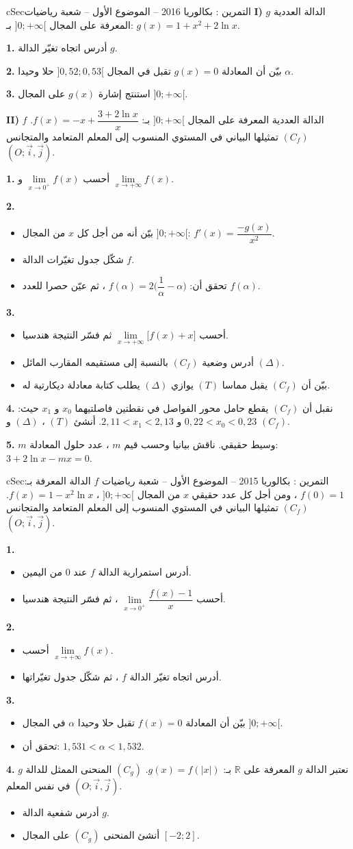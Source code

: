 \documentclass[12pt,a4paper]{article}
\newenvironment{BOX}[2]{\begin{otherlanguage}{english}\begin{arbox}{#1}{#2}}{\end{arbox}\end{otherlanguage}}
\newcounter{exo}
\newenvironment{tamrin}[1]{\stepcounter{exo}\begin{BOX}{cSec}{التمرين \theexo: #1}}{\end{BOX}}
\newcommand{\R}{\mathbb{R}}
\newenvironment{sq}{\begin{itemize}[leftmargin=2.4em,itemsep=3pt]}{\end{itemize}}
\newcommand{\qa}{\item[(أ)]}\newcommand{\qb}{\item[(ب)]}\newcommand{\qc}{\item[(جـ)]}\newcommand{\qd}{\item[(د)]}\newcommand{\qe}{\item[(هـ)]}
\newcommand{\QQ}[1]{\par\smallskip\textbf{#1.} }
\begin{document}
\begin{tamrin}{بكالوريا 2016 -- الموضوع الأول -- شعبة رياضيات}
\textbf{I)} $g$ الدالة العددية المعرفة على المجال $]0;+\infty[$ بـ: $g(x)=1+x^2+2\ln x$.
\QQ{1} أدرس اتجاه تغيّر الدالة $g$.
\QQ{2} بيّن أن المعادلة $g(x)=0$ تقبل في المجال $]0{,}52;0{,}53[$ حلا وحيدا $\alpha$.
\QQ{3} استنتج إشارة $g(x)$ على المجال $]0;+\infty[$.

\textbf{II)} $f$ الدالة العددية المعرفة على المجال $]0;+\infty[$ بـ: $f(x)=-x+\dfrac{3+2\ln x}{x}$.
$(C_f)$ تمثيلها البياني في المستوي المنسوب إلى المعلم المتعامد والمتجانس $(O;\vec i,\vec j)$.
\QQ{1} أحسب $\lim\limits_{x\to0^{+}}f(x)$ و $\lim\limits_{x\to+\infty}f(x)$.
\QQ{2}
\begin{sq}
\qa بيّن أنه من أجل كل $x$ من المجال $]0;+\infty[$: $f'(x)=\dfrac{-g(x)}{x^2}$.
\qb شكّل جدول تغيّرات الدالة $f$.
\qc تحقق أن: $f(\alpha)=2\Big(\dfrac1\alpha-\alpha\Big)$ ، ثم عيّن حصرا للعدد $f(\alpha)$.
\end{sq}
\QQ{3}
\begin{sq}
\qa أحسب $\lim\limits_{x\to+\infty}\big[f(x)+x\big]$ ثم فسّر النتيجة هندسيا.
\qb أدرس وضعية $(C_f)$ بالنسبة إلى مستقيمه المقارب المائل $(\Delta)$.
\qc بيّن أن $(C_f)$ يقبل مماسا $(T)$ يوازي $(\Delta)$ يطلب كتابة معادلة ديكارتية له.
\end{sq}
\QQ{4} نقبل أن $(C_f)$ يقطع حامل محور الفواصل في نقطتين فاصلتيهما $x_0$ و $x_1$ حيث: $0{,}22<x_0<0{,}23$ و $2{,}11<x_1<2{,}13$.
أنشئ $(T)$ ، $(\Delta)$ و $(C_f)$.
\QQ{5} $m$ وسيط حقيقي. ناقش بيانيا وحسب قيم $m$ ، عدد حلول المعادلة: $3+2\ln x-mx=0$.
\end{tamrin}

\begin{tamrin}{بكالوريا 2015 -- الموضوع الأول -- شعبة رياضيات}
$f$ الدالة المعرفة بـ: $f(0)=1$ ، ومن أجل كل عدد حقيقي $x$ من المجال $]0;+\infty[$ ، $f(x)=1-x^2\ln x$.
$(C_f)$ تمثيلها البياني في المستوي المنسوب إلى المعلم المتعامد والمتجانس $(O;\vec i,\vec j)$.
\QQ{1}
\begin{sq}
\qa أدرس استمرارية الدالة $f$ عند $0$ من اليمين.
\qb أحسب $\lim\limits_{x\to0^{+}}\dfrac{f(x)-1}{x}$ ، ثم فسّر النتيجة هندسيا.
\end{sq}
\QQ{2}
\begin{sq}
\qa أحسب $\lim\limits_{x\to+\infty}f(x)$.
\qb أدرس اتجاه تغيّر الدالة $f$ ، ثم شكّل جدول تغيّراتها.
\end{sq}
\QQ{3}
\begin{sq}
\qa بيّن أن المعادلة $f(x)=0$ تقبل حلا وحيدا $\alpha$ في المجال $]0;+\infty[$.
\qb تحقق أن: $1{,}531<\alpha<1{,}532$.
\end{sq}
\QQ{4} نعتبر الدالة $g$ المعرفة على $\R$ بـ: $g(x)=f(|x|)$. $(C_g)$ المنحنى الممثل للدالة $g$ في نفس المعلم $(O;\vec i,\vec j)$.
\begin{sq}
\qa أدرس شفعية الدالة $g$.
\qb أنشئ المنحنى $(C_g)$ على المجال $[-2;2]$.
\end{sq}
\end{tamrin}
\end{document}
